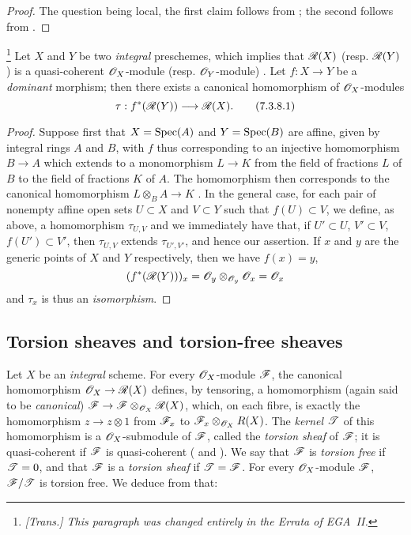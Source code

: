 \begin{proof}
The question being local, the first claim follows from ; the second follows from .
\end{proof}

\begin{env}[7.3.8]
\label{I.7.3.8}
\footnote{\emph{[Trans.] This paragraph was changed entirely in the Errata of EGA~II.}}
Let $X$ and $Y$ be two \emph{integral} preschemes, which implies that $\mathscr{R}(X)$ (resp. $\mathscr{R}(Y)$) is a quasi-coherent $\mathscr{O}_X$-module (resp. $\mathscr{O}_Y$-module) .
Let $f:X\to Y$ be a \emph{dominant} morphism; then there exists a canonical homomorphism of $\mathscr{O}_X$-modules
\[
\label{I.7.3.8.1}
  \tau:f^*(\sh{R}(Y))\to\sh{R}(X).
  \tag{7.3.8.1}
\]
\end{env}

\begin{proof}
Suppose first that $X=\operatorname{Spec}(A)$ and $Y=\operatorname{Spec}(B)$ are affine, given by integral rings $A$ and $B$, with $f$ thus corresponding to an injective homomorphism $B\to A$ which extends to a monomorphism $L\to K$ from the field of fractions $L$ of $B$ to the field of fractions $K$ of $A$.
The homomorphism  then corresponds to the canonical homomorphism $L\otimes_B A\to K$ .
In the general case, for each pair of nonempty affine open sets $U\subset X$ and $V\subset Y$ such that $f(U)\subset V$, we define, as above, a homomorphism $\tau_{U,V}$ and we immediately have that, if $U'\subset U$, $V'\subset V$, $f(U')\subset V'$, then $\tau_{U,V}$ extends $\tau_{U',V'}$, and hence our assertion.
If $x$ and $y$ are the generic points of $X$ and $Y$ respectively, then we have $f(x)=y$,
\[
  (f^*(\mathscr{R}(Y)))_x=\mathscr{O}_y\otimes_{\mathscr{O}_y}\mathscr{O}_x=\mathscr{O}_x
\]
 and $\tau_x$ is thus an \emph{isomorphism}.
\end{proof}

\subsection{Torsion sheaves and torsion-free sheaves}
\label{subsection:I.7.4}

\begin{env}[7.4.1]
\label{I.7.4.1}
Let $X$ be an \emph{integral} scheme.
For every $\mathscr{O}_X$-module $\mathscr{F}$, the canonical homomorphism $\sh{O}_X\to\sh{R}(X)$ defines, by tensoring, a homomorphism (again said to be \emph{canonical}) $\sh{F}\to\sh{F}\otimes_{\sh{O}_X}\sh{R}(X)$, which, on each fibre, is exactly the homomorphism $z\to z\otimes1$ from $\mathscr{F}_x$ to $\mathscr{F}_x\otimes_{\mathscr{O}_X}R(X)$.
The \emph{kernel $\mathscr{T}$} of this homomorphism is a $\mathscr{O}_X$-submodule of $\mathscr{F}$, called the \emph{torsion sheaf} of $\mathscr{F}$; it is quasi-coherent if $\mathscr{F}$ is quasi-coherent ( and ).
We say that $\mathscr{F}$ is \emph{torsion free} if $\mathscr{T}=0$, and that $\mathscr{F}$ is a \emph{torsion sheaf} if $\mathscr{T}=\mathscr{F}$.
For every $\mathscr{O}_X$-module $\mathscr{F}$, $\mathscr{F}/\mathscr{T}$ is torsion free.
We deduce from  that:
\end{env}

